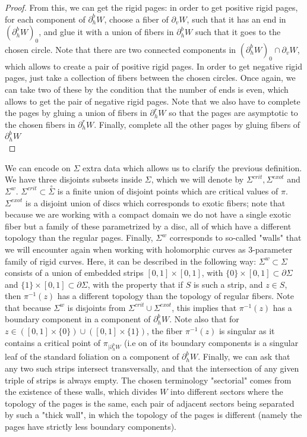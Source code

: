 \documentclass[../main.tex]{subfiles}
\begin{document}
\begin{proof}
From this, we can get the rigid pages: in order to get positive rigid pages, for each component of $\partial_h^b W$, choose a fiber of $\partial_v W$, such that it has an end in $(\partial_h^b W)_0$, and glue it with a union of fibers in $\partial_h^bW$ such that it goes to the chosen circle. Note that there are two connected components in $(\partial_h^b W)_0\cap \partial_vW$, which allows to create a pair of positive rigid pages. In order to get negative rigid pages, just take a collection of fibers between the chosen circles. Once again, we can take two of these by the condition that the number of ends is even, which allows to get the pair of negative rigid pages. Note that we also have to complete the pages by gluing a union of fibers in $\partial_h^rW$ so that the pages are asymptotic to the chosen fibers in $\partial_h^rW$. Finally, complete all the other pages by gluing fibers of $\partial_h^bW$ \\

\end{proof}

\begin{remark}\label{r:encode_sectorial}
We can encode on $\Sigma$ extra data which allows us to clarify the previous definition. We have three disjoints subsets inside $\Sigma$, which we will denote by $\Sigma^{crit}, \Sigma^{exot}$ and $\Sigma^{w}$. $\Sigma^{crit}\subset \overset \circ{\Sigma}$ is a finite union of disjoint points which are critical values of $\pi$. $\Sigma^{exot}$ is a disjoint union of discs which corresponds to exotic fibers; note that because we are working with a compact domain we do not have a single exotic fiber but a family of these parametrized by a disc, all of which have a different topology than the regular pages. Finally, $\Sigma^w$ corresponds to so-called "walls" that we will encounter again when working with holomorphic curves as $3$-parameter family of rigid curves. Here, it can be described in the following way: $\Sigma^w\subset \Sigma$ consists of a union of embedded strips $[0,1]\times [0,1]$, with $\{0\}\times [0,1]\subset \partial\Sigma$ and $\{1\}\times [0,1]\subset\partial\Sigma$, with the property that if $S$ is such a strip, and $z\in S$, then $\pi^{-1}(z)$ has a different topology than the topology of regular fibers. Note that because $\Sigma^w$ is disjoints from $\Sigma^{crit}\cup\Sigma^{exot}$, this implies that $\pi^{-1}(z)$ has a boundary component in a component of $\partial_h^bW$. Note also that for $z\in ([0,1]\times \{0\})\cup ([0,1]\times \{1\})$, the fiber $\pi^{-1}(z)$ is singular as it contains a critical point of $\pi_{|\partial_h^bW}$ (i.e on of its boundary components is a singular leaf of the standard foliation on a component of $\partial_h^b W$. Finally, we can ask that any two such strips intersect transversally, and that the intersection of any given triple of strips is always empty. The chosen terminology "sectorial" comes from the existence of these walls, which divides $W$ into different sectors where the topology of the pages is the same, each pair of adjacent sectors being separated by such a "thick wall", in which the topology of the pages is different (namely the pages have strictly less boundary components). 
\end{remark}
\end{document}
